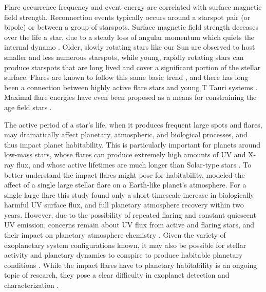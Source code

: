 \documentclass[twocolumn]{aastex6}
\begin{document}

Flare occurrence frequency and event energy are correlated with surface magnetic field strength. Reconnection events typically occurs around a starspot pair (or bipole) or between a group of starspots. Surface magnetic field strength deceases over the life a star, due to a steady loss of angular momentum which quiets the internal dynamo \citep{skumanich1972}. Older, slowly rotating stars like our Sun are observed to host smaller and less numerous starspots, while young, rapidly rotating stars can produce starspots that are long lived and cover a significant portion of the stellar surface. Flares are known to follow this same basic trend \citep{ambartsumian1975}, and there has long been a connection between highly active flare stars and young T Tauri systems \citep{haro1957}. Maximal flare energies have even been proposed as a means for constraining the age field stars \citep[e.g.][]{parsamyan1976,parsamyan1995}.


The active period of a star's life, when it produces frequent large spots and flares, may dramatically affect planetary, atmospheric, and biological processes, and thus impact planet habitability. This is particularly important for planets around low-mass stars, whose flares can produce extremely high amounts of UV and X-ray flux, and whose active lifetimes are much longer than Solar-type stars \citep{west2008}. To better understand the impact flares might pose for habitability, \citet{segura2010} modeled the affect of a single large stellar flare on a Earth-like planet's atmosphere. For a single large flare this study found only a short timescale increase in biologically harmful UV surface flux, and full planetary atmosphere recovery within two years. However, due to the possibility of repeated flaring and constant quiescent UV emission, concerns remain about UV flux from active and flaring stars, and their impact on planetary atmosphere chemistry \citep{france2014}. Given the variety of exoplanetary system configurations known, it may also be possible for stellar activity and planetary dynamics to conspire to produce habitable planetary conditions \citep{luger2015}. While the impact flares have to planetary habitability is an ongoing topic of research, they pose a clear difficulty in exoplanet detection and characterization \citep{poppenhaeger2015}.
\end{document}
